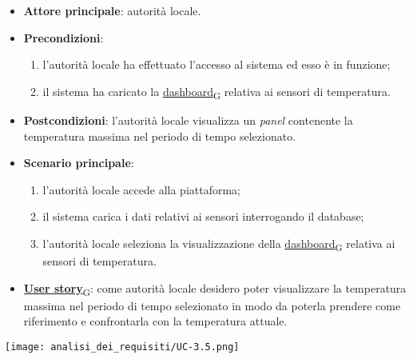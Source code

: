 \begin{itemize}
	\item \textbf{Attore principale}: autorità locale.
	\item \textbf{Precondizioni}:
	      \begin{enumerate}
		      \item l'autorità locale ha effettuato l'accesso al sistema ed esso è in funzione;
		      \item il sistema ha caricato la \href{https://7last.github.io/docs/rtb/documentazione-interna/glossario\#dashboard}{dashboard\textsubscript{G}} relativa ai sensori di temperatura.
	      \end{enumerate}
	\item \textbf{Postcondizioni}: l'autorità locale visualizza un \textit{panel} contenente la temperatura massima nel periodo di tempo selezionato.
	\item \textbf{Scenario principale}:
	      \begin{enumerate}
		      \item l'autorità locale accede alla piattaforma;
		      \item il sistema carica i dati relativi ai sensori interrogando il database;
		      \item l'autorità locale seleziona la visualizzazione della \href{https://7last.github.io/docs/rtb/documentazione-interna/glossario\#dashboard}{dashboard\textsubscript{G}} relativa ai sensori di temperatura.
	      \end{enumerate}
	\item \href{https://7last.github.io/docs/rtb/documentazione-interna/glossario\#user-story}{\textbf{User story}\textsubscript{G}}:
	      come autorità locale desidero poter visualizzare la temperatura massima nel periodo di tempo selezionato
	      in modo da poterla prendere come riferimento e confrontarla con la temperatura attuale.
\end{itemize}
\begin{center}
	\texttt{[image: analisi\_dei\_requisiti/UC-3.5.png]}
\end{center}

\newpage

